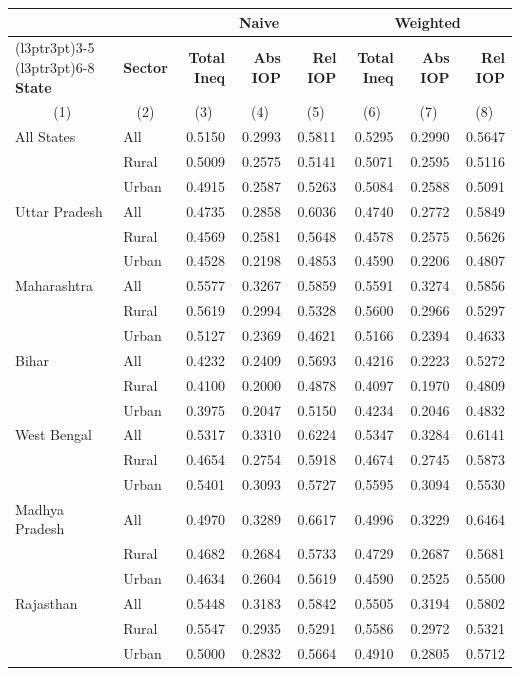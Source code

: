 
\begin{tabular}{llrrrrrr}
\toprule
\multicolumn{2}{c}{\textbf{ }} & \multicolumn{3}{c}{\textbf{Naive}} & \multicolumn{3}{c}{\textbf{Weighted}} \\
\cmidrule(l{3pt}r{3pt}){3-5} \cmidrule(l{3pt}r{3pt}){6-8}
\textbf{State} & \textbf{Sector} & \textbf{Total Ineq} & \textbf{Abs IOP} & \textbf{Rel IOP} & \textbf{Total Ineq} & \textbf{Abs IOP} & \textbf{Rel IOP}\\
\multicolumn{1}{c}{(1)} & \multicolumn{1}{c}{(2)} & \multicolumn{1}{c}{(3)} & \multicolumn{1}{c}{(4)} & \multicolumn{1}{c}{(5)} & \multicolumn{1}{c}{(6)} & \multicolumn{1}{c}{(7)} & \multicolumn{1}{c}{(8)} \\
\midrule
All States & All & 0.5150 & 0.2993 & 0.5811 & 0.5295 & 0.2990 & 0.5647\\
 & Rural & 0.5009 & 0.2575 & 0.5141 & 0.5071 & 0.2595 & 0.5116\\
 & Urban & 0.4915 & 0.2587 & 0.5263 & 0.5084 & 0.2588 & 0.5091\\
\addlinespace
Uttar Pradesh & All & 0.4735 & 0.2858 & 0.6036 & 0.4740 & 0.2772 & 0.5849\\
 & Rural & 0.4569 & 0.2581 & 0.5648 & 0.4578 & 0.2575 & 0.5626\\
 & Urban & 0.4528 & 0.2198 & 0.4853 & 0.4590 & 0.2206 & 0.4807\\
\addlinespace
Maharashtra & All & 0.5577 & 0.3267 & 0.5859 & 0.5591 & 0.3274 & 0.5856\\
 & Rural & 0.5619 & 0.2994 & 0.5328 & 0.5600 & 0.2966 & 0.5297\\
 & Urban & 0.5127 & 0.2369 & 0.4621 & 0.5166 & 0.2394 & 0.4633\\
\addlinespace
Bihar & All & 0.4232 & 0.2409 & 0.5693 & 0.4216 & 0.2223 & 0.5272\\
 & Rural & 0.4100 & 0.2000 & 0.4878 & 0.4097 & 0.1970 & 0.4809\\
 & Urban & 0.3975 & 0.2047 & 0.5150 & 0.4234 & 0.2046 & 0.4832\\
\addlinespace
West Bengal & All & 0.5317 & 0.3310 & 0.6224 & 0.5347 & 0.3284 & 0.6141\\
 & Rural & 0.4654 & 0.2754 & 0.5918 & 0.4674 & 0.2745 & 0.5873\\
 & Urban & 0.5401 & 0.3093 & 0.5727 & 0.5595 & 0.3094 & 0.5530\\
\addlinespace
Madhya Pradesh & All & 0.4970 & 0.3289 & 0.6617 & 0.4996 & 0.3229 & 0.6464\\
 & Rural & 0.4682 & 0.2684 & 0.5733 & 0.4729 & 0.2687 & 0.5681\\
 & Urban & 0.4634 & 0.2604 & 0.5619 & 0.4590 & 0.2525 & 0.5500\\
\addlinespace
Rajasthan & All & 0.5448 & 0.3183 & 0.5842 & 0.5505 & 0.3194 & 0.5802\\
 & Rural & 0.5547 & 0.2935 & 0.5291 & 0.5586 & 0.2972 & 0.5321\\
 & Urban & 0.5000 & 0.2832 & 0.5664 & 0.4910 & 0.2805 & 0.5712\\
\bottomrule
\end{tabular}
